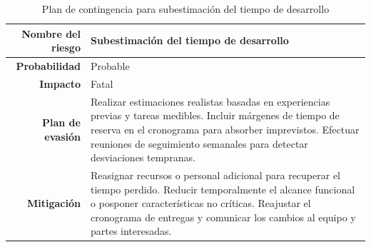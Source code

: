 \begin{table}[H]
	\centering
	\renewcommand{\arraystretch}{1.2}
	\setlength{\tabcolsep}{4pt}
	\begin{tabular}{r|p{}}
		\hline
		\textbf{Nombre del riesgo} & \textbf{Subestimación del tiempo de desarrollo} \\ \hline
		\textbf{Probabilidad} & Probable \\ \hline
		\textbf{Impacto} & Fatal \\ \hline
		\textbf{Plan de evasión} & 
		Realizar estimaciones realistas basadas en experiencias previas y tareas medibles. 
		Incluir márgenes de tiempo de reserva en el cronograma para absorber imprevistos. 
		Efectuar reuniones de seguimiento semanales para detectar desviaciones tempranas. \\ \hline
		\textbf{Mitigación} & 
		Reasignar recursos o personal adicional para recuperar el tiempo perdido. 
		Reducir temporalmente el alcance funcional o posponer características no críticas. 
		Reajustar el cronograma de entregas y comunicar los cambios al equipo y partes interesadas. \\ 
	\end{tabular}
	\caption{Plan de contingencia para subestimación del tiempo de desarrollo}
	\label{table:contingencia_subestimacion}
\end{table}


